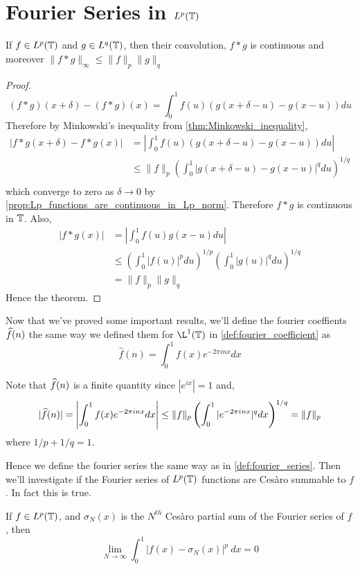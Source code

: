 \section{Fourier Series in $L^p(\mathbb T)$}
\begin{proposition}
  \label{prop:convolution_of_Lp_functions}
  If $f \in L^p(\mathbb T)$ and $g \in L^q(\mathbb T)$, then their convolution, $f*g$ is continuous and moreover $\|f*g\|_{\infty} \le \|f\|_p \|g\|_q$
\end{proposition}
\begin{proof}
  $$(f*g)(x+\delta) - (f*g)(x) = \int_0^1 f(u)(g(x+\delta - u) - g(x-u)) du $$
  Therefore by Minkowski's inequality from \autoref{thm:Minkowski_inequality}, 
  \begin{align*}
    |f*g(x+\delta) - f*g(x)| &= \left| \int_0^1 f(u) (g(x + \delta -u)- g(x-u)) du \right| \\
          &\le \|f\|_p \left( \int_0^1|g(x+\delta - u) - g(x-u)|^q du \right)^{1/q} \\
  \end{align*}
  which converge to zero as $\delta \to 0$ by \autoref{prop:Lp_functions_are_continuous_in_Lp_norm}. Therefore $f*g$ is continuous in $\mathbb T$.
  Also, 
  \begin{align*}
    |f*g(x)| &= \left| \int_0^1 f(u)g(x-u) du \right| \\
            &\le \left(\int_0^1 |f(u)|^p du \right)^{1/p} \left(\int_0^1 |g(u)|^q du \right)^{1/q} \\
            &= \|f\|_p \|g\|_q
  \end{align*}
  Hence the theorem.
\end{proof}


Now that we've proved some important results, we'll define the fourier coeffients $\widehat{f}(n)$ the same way we defined them for $\L^1(\T)$ in \autoref{def:fourier_coefficient} as 
$$\hat{f}(n) = \int_0^1 f(x)e^{-2\pi inx} dx$$

Note that $\widehat{f}(n)$ is a finite quantity since $|e^{ix}| = 1$ and,
$$ |\widehat{f}(n)| = \left| \int_0^1 f(x)e^{-2\pi inx} dx \right| \le \|f\|_p\left(\int_0^1 |e^{-2\pi inx}|^q dx\right)^{1/q} = \|f\|_p $$ where $1/p + 1/q = 1$.

Hence we define the fourier series the same way as in \autoref{def:fourier_series}. Then we'll investigate if the Fourier series of $L^p(\mathbb T)$ functions are Ces\`aro summable to $f$. In fact this is true.

\begin{theorem}
  If $f\in L^p(\mathbb T)$, and $\sigma_N(x)$ is the $N^{th}$ Ces\`aro partial sum of the Fourier series of $f$, then
  $$ \lim_{N \to \infty} \int_0^1 |f(x) - \sigma_N(x)|^p \ dx = 0$$
\end{theorem}

